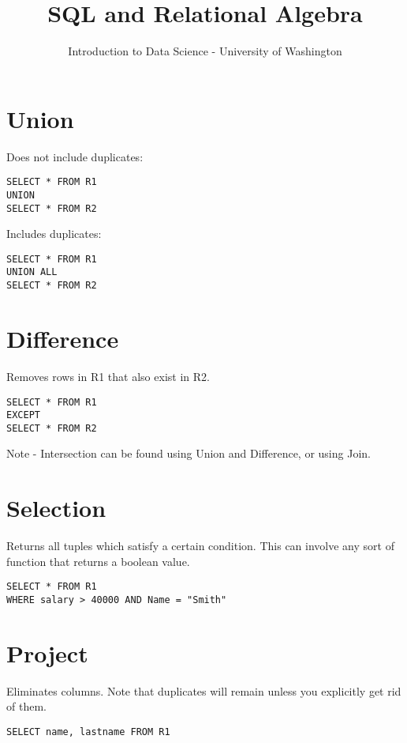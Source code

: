 \documentclass{article}
\title{SQL and Relational Algebra}
\author{Introduction to Data Science - University of Washington}
\begin{document}
\maketitle


\section{Union}

Does not include duplicates:

\begin{verbatim}
SELECT * FROM R1
UNION
SELECT * FROM R2
\end{verbatim}

Includes duplicates:

\begin{verbatim}
SELECT * FROM R1
UNION ALL
SELECT * FROM R2
\end{verbatim}

\section{Difference}

Removes rows in R1 that also exist in R2. 

\begin{verbatim}
SELECT * FROM R1
EXCEPT
SELECT * FROM R2
\end{verbatim}

Note - Intersection can be found using Union and Difference, or using Join. 

\section{Selection}

Returns all tuples which satisfy a certain condition. This can involve any sort of function that returns a boolean value. 

\begin{verbatim}
SELECT * FROM R1
WHERE salary > 40000 AND Name = "Smith"
\end{verbatim}

\section{Project}

Eliminates columns. Note that duplicates will remain unless you explicitly get rid of them. 

\begin{verbatim}
SELECT name, lastname FROM R1
\end{verbatim}
\end{document}
